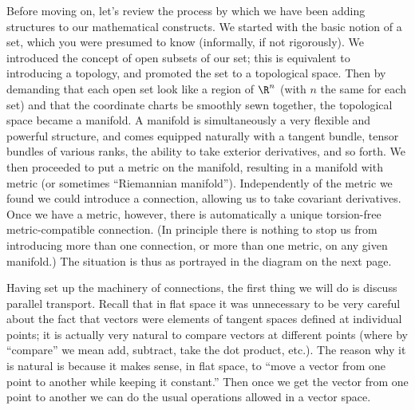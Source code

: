 Before moving on, let's review the process by which we have been
adding structures to our mathematical constructs.  We started with
the basic notion of a set, which you were presumed to know (informally,
if not rigorously).  We introduced the concept of open subsets of
our set; this is equivalent
to introducing a topology, and promoted the set to a topological
space.  Then by demanding that each open set look like a region of
$\R^n$ (with $n$ the same for each set) and that the coordinate
charts be smoothly sewn together, the topological space became a
manifold.  A manifold is simultaneously a very flexible and powerful
structure, and comes equipped naturally with a tangent bundle,
tensor bundles of various ranks, the
ability to take exterior derivatives, and so forth.  We then proceeded
to put a metric on the manifold, resulting in a manifold with metric
(or sometimes ``Riemannian manifold'').
Independently of the metric we found we could introduce a connection,
allowing us to take covariant derivatives.  Once we have a metric,
however,
there is automatically a unique torsion-free metric-compatible
connection.  (In principle there is nothing to stop us from introducing
more than one connection, or more than one metric, on any given
manifold.)  The situation is thus as portrayed in the diagram on
the next page.

\eject

\begin{figure}
  \centerline{
  }
\end{figure}

Having set up the machinery of connections, the first thing we will
do is discuss parallel transport.  Recall that in flat space it was
unnecessary to be very careful about the fact that vectors were
elements of tangent spaces defined at individual points; it is
actually very natural to compare vectors at different points (where
by ``compare'' we mean add, subtract, take the dot product, etc.).
The reason why it is natural is because it makes sense, in flat space,
to ``move a vector from one point to another while keeping it constant.''
Then once we get the vector from one point to another we can do the
usual operations allowed in a vector space.

\begin{figure}[h]
  \centerline{
  }
\end{figure}

